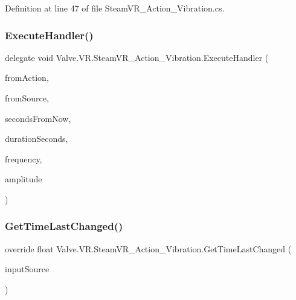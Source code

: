 Definition at line 47 of file Steam\+V\+R\+\_\+\+Action\+\_\+\+Vibration.\+cs.

\mbox{\label{class_valve_1_1_v_r_1_1_steam_v_r___action___vibration_ac075e9e8f3e9eea89be32c403e6f86d5}} 
\subsubsection{\texorpdfstring{ExecuteHandler()}{ExecuteHandler()}}
{\footnotesize\ttfamily delegate void Valve.\+V\+R.\+Steam\+V\+R\+\_\+\+Action\+\_\+\+Vibration.\+Execute\+Handler (\begin{DoxyParamCaption}\item[{\mbox{\hyperlink{class_valve_1_1_v_r_1_1_steam_v_r___action___vibration}{Steam\+V\+R\+\_\+\+Action\+\_\+\+Vibration}}}]{from\+Action,  }\item[{\mbox{\hyperlink{namespace_valve_1_1_v_r_a82e5bf501cc3aa155444ee3f0662853f}{Steam\+V\+R\+\_\+\+Input\+\_\+\+Sources}}}]{from\+Source,  }\item[{float}]{seconds\+From\+Now,  }\item[{float}]{duration\+Seconds,  }\item[{float}]{frequency,  }\item[{float}]{amplitude }\end{DoxyParamCaption})}

\mbox{\label{class_valve_1_1_v_r_1_1_steam_v_r___action___vibration_ab4a746a1c972e2a301f82c326dbea34b}} 
\subsubsection{\texorpdfstring{GetTimeLastChanged()}{GetTimeLastChanged()}}
{\footnotesize\ttfamily override float Valve.\+V\+R.\+Steam\+V\+R\+\_\+\+Action\+\_\+\+Vibration.\+Get\+Time\+Last\+Changed (\begin{DoxyParamCaption}\item[{\mbox{\hyperlink{namespace_valve_1_1_v_r_a82e5bf501cc3aa155444ee3f0662853f}{Steam\+V\+R\+\_\+\+Input\+\_\+\+Sources}}}]{input\+Source }\end{DoxyParamCaption})}




